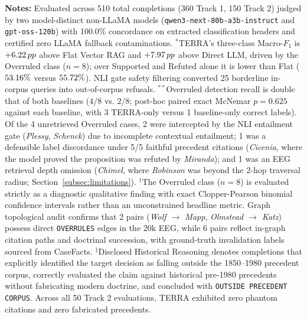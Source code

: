 \raggedright \fontsize{8.5}{10.5}\selectfont \textbf{Notes:} Evaluated across 510 total completions (360 Track 1, 150 Track 2) judged by two model-distinct non-LLaMA models (\texttt{qwen3-\allowbreak{}next-\allowbreak{}80b-\allowbreak{}a3b-\allowbreak{}instruct} and \texttt{gpt-\allowbreak{}oss-\allowbreak{}120b}) with 100.0\% concordance on extracted classification headers and certified zero LLaMA fallback contaminations.
$^*$TERRA's three-class Macro-$F_1$ is $+6.22\,pp$ above Flat Vector RAG and $+7.97\,pp$ above Direct LLM, driven by the Overruled class ($n=8$); over Supported and Refuted alone it is lower than Flat ($53.16\%$ versus $55.72\%$). NLI gate safety filtering converted 25 borderline in-corpus queries into out-of-corpus refusals.
$^{**}$Overruled detection recall is double that of both baselines ($4/8$ vs. $2/8$; post-hoc paired exact McNemar $p=0.625$ against each baseline, with 3 TERRA-only versus 1 baseline-only correct labels). Of the 4 unretrieved Overruled cases, 2 were intercepted by the NLI entailment gate (\textit{Plessy}, \textit{Schenck}) due to incomplete contextual entailment; 1 was a defensible label discordance under 5/5 faithful precedent citations (\textit{Cicenia}, where the model proved the proposition was refuted by \textit{Miranda}); and 1 was an EEG retrieval depth omission (\textit{Chimel}, where \textit{Robinson} was beyond the 2-hop traversal radius; Section~\ref{subsec:limitations}).
$^\dagger$The Overruled class ($n=8$) is evaluated strictly as a diagnostic qualitative finding with exact Clopper-Pearson binomial confidence intervals rather than an unconstrained headline metric. Graph topological audit confirms that 2 pairs (\textit{Wolf $\to$ Mapp}, \textit{Olmstead $\to$ Katz}) possess direct \texttt{OVERRULES} edges in the 20k EEG, while 6 pairs reflect in-graph citation paths and doctrinal succession, with ground-truth invalidation labels sourced from CaseFacts.
$^\ddagger$Disclosed Historical Reasoning denotes completions that explicitly identified the target decision as falling outside the 1850--1980 precedent corpus, correctly evaluated the claim against historical pre-1980 precedents without fabricating modern doctrine, and concluded with \texttt{OUTSIDE PRECEDENT CORPUS}. Across all 50 Track 2 evaluations, TERRA exhibited zero phantom citations and zero fabricated precedents.
\endgroup





